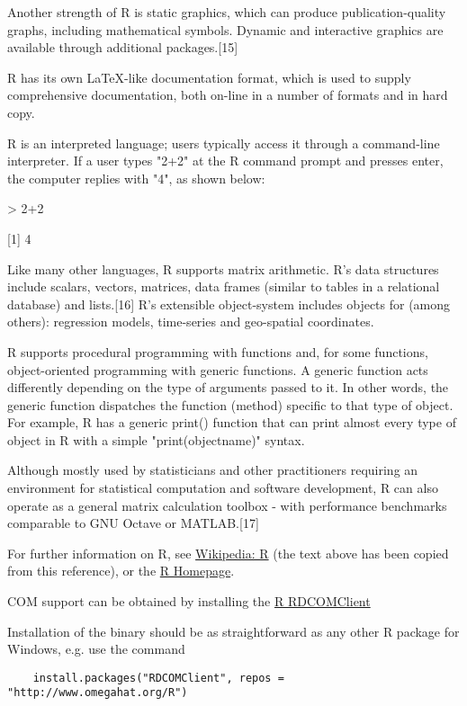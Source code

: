 	\vpara
	Another strength of R is static graphics, which can produce publication-quality graphs, including mathematical symbols. Dynamic and interactive graphics are available through additional packages.[15]
	
	\vpara
	R has its own LaTeX-like documentation format, which is used to supply comprehensive documentation, both on-line in a number of formats and in hard copy.
	
	\vpara
	R is an interpreted language; users typically access it through a command-line interpreter. If a user types "2+2" at the R command prompt and presses enter, the computer replies with "4", as shown below:
	
	> 2+2
	
	[1] 4
	
	\vpara
	Like many other languages, R supports matrix arithmetic. R's data structures include scalars, vectors, matrices, data frames (similar to tables in a relational database) and lists.[16] R's extensible object-system includes objects for (among others): regression models, time-series and geo-spatial coordinates.
	
	\vpara
	R supports procedural programming with functions and, for some functions, object-oriented programming with generic functions. A generic function acts differently depending on the type of arguments passed to it. In other words, the generic function dispatches the function (method) specific to that type of object. For example, R has a generic print() function that can print almost every type of object in R with a simple "print(objectname)" syntax.
	
	\vpara
	Although mostly used by statisticians and other practitioners requiring an environment for statistical computation and software development, R can also operate as a general matrix calculation toolbox - with performance benchmarks comparable to GNU Octave or MATLAB.[17]
	
	\vpara
	For further information on R, see \href{http://en.wikipedia.org/wiki/R_(programming_language)}{Wikipedia: R} (the text above has been copied from this reference), or the  \href{http://www.r-project.org/}{R Homepage}.
	
	\vpara
	COM support can be obtained by installing the \href{http://www.omegahat.org/RDCOMClient/}{R RDCOMClient} 
	
	Installation of the binary should be as straightforward as any other R package for Windows, e.g. use the command 
	
	\begin{verbatim} 
	install.packages("RDCOMClient", repos = "http://www.omegahat.org/R")
	\end{verbatim}
	
